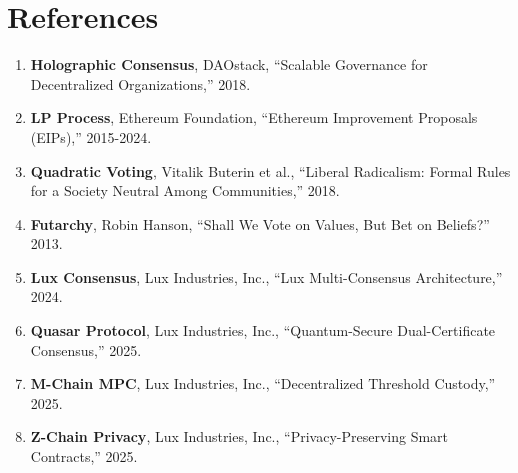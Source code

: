 \section*{References}


\begin{enumerate}
\item \textbf{Holographic Consensus}, DAOstack, ``Scalable Governance for Decentralized Organizations,'' 2018.

\item \textbf{LP Process}, Ethereum Foundation, ``Ethereum Improvement Proposals (EIPs),'' 2015-2024.

\item \textbf{Quadratic Voting}, Vitalik Buterin et al., ``Liberal Radicalism: Formal Rules for a Society Neutral Among Communities,'' 2018.

\item \textbf{Futarchy}, Robin Hanson, ``Shall We Vote on Values, But Bet on Beliefs?'' 2013.

\item \textbf{Lux Consensus}, Lux Industries, Inc., ``Lux Multi-Consensus Architecture,'' 2024.

\item \textbf{Quasar Protocol}, Lux Industries, Inc., ``Quantum-Secure Dual-Certificate Consensus,'' 2025.

\item \textbf{M-Chain MPC}, Lux Industries, Inc., ``Decentralized Threshold Custody,'' 2025.

\item \textbf{Z-Chain Privacy}, Lux Industries, Inc., ``Privacy-Preserving Smart Contracts,'' 2025.
\end{enumerate}


